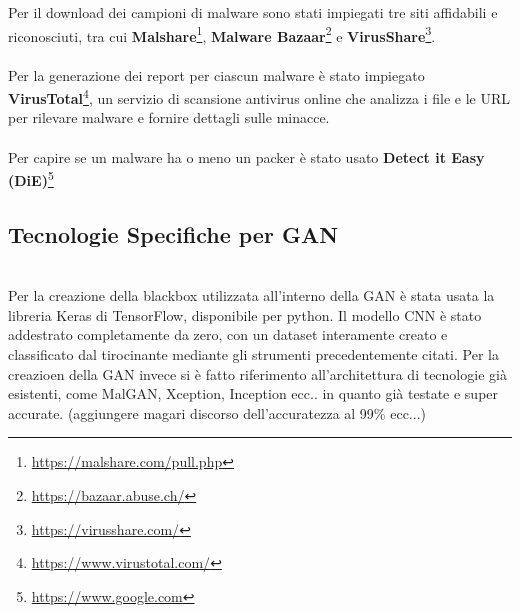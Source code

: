\\\\
Per il download dei campioni di malware sono stati impiegati tre siti affidabili e riconosciuti, tra cui \textbf{Malshare}\footnote{\url{https://malshare.com/pull.php}}, \textbf{Malware Bazaar}\footnote{\url{https://bazaar.abuse.ch/}} e \textbf{VirusShare}\footnote{\url{https://virusshare.com/}}.
\\\\
Per la generazione dei report per ciascun malware è stato impiegato \textbf{VirusTotal}\footnote{\url{https://www.virustotal.com/}}, un servizio di scansione antivirus online che analizza i file e le URL per rilevare malware e fornire dettagli sulle minacce.
\\\\
Per capire se un malware ha o meno un packer è stato usato \textbf{Detect it Easy (DiE)}\footnote{\url{https://www.google.com}}




\subsection{Tecnologie Specifiche per GAN}
~\\
\indent Per la creazione della blackbox utilizzata all'interno della GAN è stata usata la libreria Keras di TensorFlow, disponibile per python. Il modello CNN è stato addestrato completamente da zero, con un dataset interamente creato e classificato dal tirocinante mediante gli strumenti precedentemente citati. Per la creazioen della GAN invece si è fatto riferimento all'architettura di tecnologie già esistenti, come MalGAN, Xception, Inception ecc.. in quanto già testate e super accurate. (aggiungere magari discorso dell'accuratezza al 99\% ecc...)


